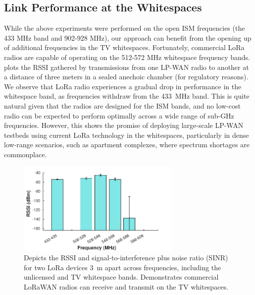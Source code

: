 \subsection{Link Performance at the Whitespaces}
While the above experiments were performed on the open ISM frequencies (the 433 MHz band and 902-928 MHz), our approach can benefit from the opening up of additional frequencies in the TV whitespaces. Fortunately, commercial LoRa radios are capable of operating on the 512-572 MHz whitespace frequency bands.  plots the RSSI gathered by transmissions from one LP-WAN radio to another at a distance of three meters in a sealed anechoic chamber (for regulatory reasons). We observe that LoRa radio experiences a gradual drop in performance in the whitespace band, as frequencies withdraw from the 433~MHz band. This is quite natural given that the radios are designed for the ISM bands, and no low-cost radio can be expected to perform optimally across a wide range of sub-GHz frequencies. However, this shows the promise of deploying large-scale LP-WAN testbeds using current LoRa technology in the whitespaces, particularly in dense low-range scenarios, such as apartment complexes, where spectrum shortages are commonplace.  

\begin{figure}
\includegraphics[height=4.5cm]{figures/Freq_vs_RSSI.pdf}
\caption{Depicts the RSSI and signal-to-interference plus noise ratio (SINR) for two LoRa devices 3~m apart across frequencies, including the unlicensed and TV whitespace bands. Demonstrates commercial LoRaWAN radios can receive and transmit on the TV whitespaces.}
\label{fig:freq-rssi}
\compactimg
\end{figure}



